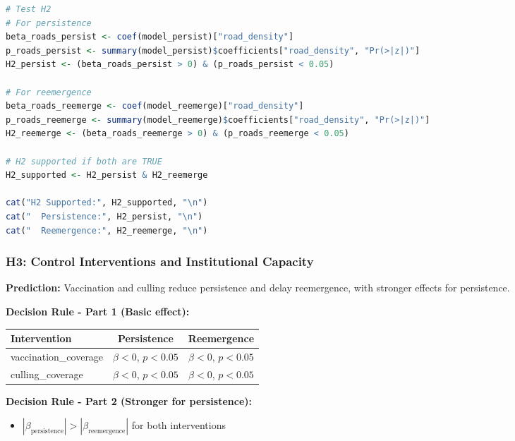 \documentclass[11pt,a4paper]{article}
\begin{document}
\begin{rcode}
\begin{lstlisting}[language=R]
# Test H2
# For persistence
beta_roads_persist <- coef(model_persist)["road_density"]
p_roads_persist <- summary(model_persist)$coefficients["road_density", "Pr(>|z|)"]
H2_persist <- (beta_roads_persist > 0) & (p_roads_persist < 0.05)

# For reemergence
beta_roads_reemerge <- coef(model_reemerge)["road_density"]
p_roads_reemerge <- summary(model_reemerge)$coefficients["road_density", "Pr(>|z|)"]
H2_reemerge <- (beta_roads_reemerge > 0) & (p_roads_reemerge < 0.05)

# H2 supported if both are TRUE
H2_supported <- H2_persist & H2_reemerge

cat("H2 Supported:", H2_supported, "\n")
cat("  Persistence:", H2_persist, "\n")
cat("  Reemergence:", H2_reemerge, "\n")
\end{lstlisting}
\end{rcode}

\subsubsection{H3: Control Interventions and Institutional Capacity}

\textbf{Prediction:} Vaccination and culling reduce persistence and delay reemergence, with stronger effects for persistence.

\textbf{Decision Rule - Part 1 (Basic effect):}

\begin{table}[h]
\centering
\small
\begin{tabular}{@{}lcc@{}}
\toprule
\textbf{Intervention} & \textbf{Persistence} & \textbf{Reemergence} \\
\midrule
vaccination\_coverage & $\beta < 0$, $p < 0.05$ & $\beta < 0$, $p < 0.05$ \\
culling\_coverage & $\beta < 0$, $p < 0.05$ & $\beta < 0$, $p < 0.05$ \\
\bottomrule
\end{tabular}
\end{table}

\textbf{Decision Rule - Part 2 (Stronger for persistence):}
\begin{itemize}
    \item $|\beta_{\text{persistence}}| > |\beta_{\text{reemergence}}|$ for both interventions
\end{itemize}
\end{document}
